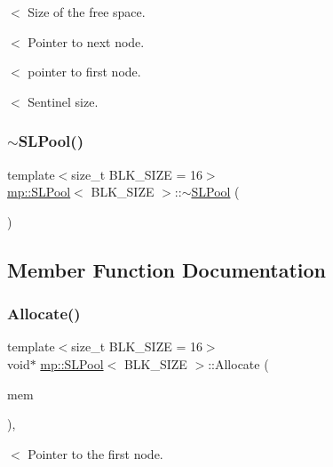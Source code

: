 $<$ Size of the free space.

$<$ Pointer to next node.

$<$ pointer to first node.

$<$ Sentinel size. \mbox{\label{classmp_1_1_s_l_pool_ab1a395b720c1f1bc3d87b43346200695}} 
\subsubsection{\texorpdfstring{$\sim$\+S\+L\+Pool()}{~SLPool()}}
{\footnotesize\ttfamily template$<$size\+\_\+t B\+L\+K\+\_\+\+S\+I\+ZE = 16$>$ \\
\hyperlink{classmp_1_1_s_l_pool}{mp\+::\+S\+L\+Pool}$<$ B\+L\+K\+\_\+\+S\+I\+ZE $>$\+::$\sim$\hyperlink{classmp_1_1_s_l_pool}{S\+L\+Pool} (\begin{DoxyParamCaption}{ }\end{DoxyParamCaption})\hspace{0.3cm}{\ttfamily [inline]}}



\subsection{Member Function Documentation}
\mbox{\label{classmp_1_1_s_l_pool_a543f5c4b2d190bbfc89170a227dc92a8}} 
\subsubsection{\texorpdfstring{Allocate()}{Allocate()}}
{\footnotesize\ttfamily template$<$size\+\_\+t B\+L\+K\+\_\+\+S\+I\+ZE = 16$>$ \\
void$\ast$ \hyperlink{classmp_1_1_s_l_pool}{mp\+::\+S\+L\+Pool}$<$ B\+L\+K\+\_\+\+S\+I\+ZE $>$\+::Allocate (\begin{DoxyParamCaption}\item[{size\+\_\+t}]{mem }\end{DoxyParamCaption})\hspace{0.3cm}{\ttfamily [inline]}, {\ttfamily [virtual]}}

$<$ Pointer to the first node.


